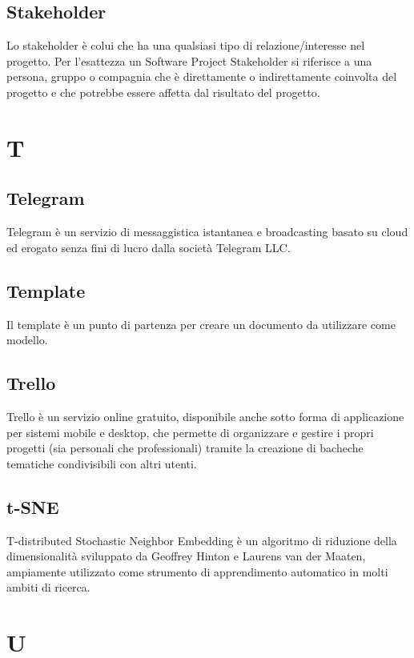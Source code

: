 \subsection{Stakeholder}
Lo stakeholder è colui che ha una qualsiasi tipo di relazione/interesse nel progetto. Per l'esattezza
un Software Project Stakeholder si riferisce a una persona, gruppo o compagnia che è direttamente o indirettamente coinvolta
del progetto e che potrebbe essere affetta dal risultato del progetto. 

\newpage
\section{T}
\subsection{Telegram}
Telegram è un servizio di messaggistica istantanea e broadcasting basato su cloud ed erogato senza fini di lucro dalla società Telegram LLC.

\subsection{Template}
Il template è un punto di partenza per creare un documento da utilizzare come modello.

\subsection{Trello}
Trello è un servizio online gratuito, disponibile anche sotto forma di applicazione per sistemi mobile e desktop, che permette di organizzare e gestire i propri progetti (sia personali che professionali) tramite la creazione di bacheche tematiche condivisibili con altri utenti.

\subsection{t-SNE}
T-distributed Stochastic Neighbor Embedding è un algoritmo di riduzione della dimensionalità sviluppato da Geoffrey Hinton e Laurens van der Maaten, ampiamente utilizzato come strumento di apprendimento automatico in molti ambiti di ricerca.

\newpage
\section{U}
